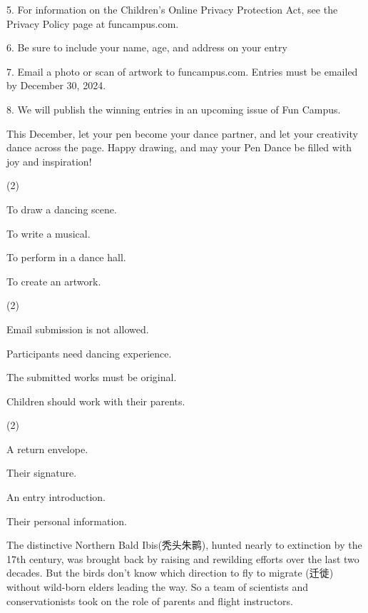 \documentclass{英语试卷}
\begin{document}
\par 5. For information on the Children's Online Privacy Protection Act, see the Privacy Policy page at funcampus.com.\par
\par 6. Be sure to include your name, age, and address on your entry\par
\par 7. Email a photo or scan of artwork to funcampus.com. Entries must be emailed by December 30, 2024.\par
\par 8. We will publish the winning entries in an upcoming issue of Fun Campus.\par
\par This December, let your pen become your dance partner, and let your creativity dance across the page. Happy drawing, and may your Pen Dance be filled with joy and inspiration!\par
{}
\begin{choices}(2)
  \item To draw a dancing scene.
  \item To write a musical.
  \item To perform in a dance hall.
  \item To create an artwork.
\end{choices}
\begin{choices}(2)
  \item Email submission is not allowed.
  \item Participants need dancing experience.
  \item The submitted works must be original.
  \item Children should work with their parents.
\end{choices}
\begin{choices}(2)
  \item A return envelope.
  \item Their signature.
  \item An entry introduction.
  \item Their personal information.
\end{choices}
\par The distinctive Northern Bald Ibis(秃头朱鹮), hunted nearly to extinction by the 17th century, was brought back by raising and rewilding efforts over the last two decades. But the birds don't know which direction to fly to migrate (迁徙) without wild-born elders leading the way. So a team of scientists and conservationists took on the role of parents and flight instructors.\par
\end{document}

